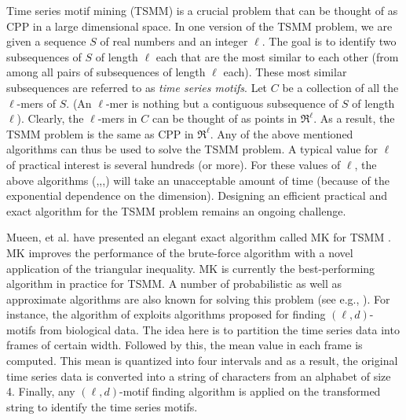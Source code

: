 \documentclass{article}
\theoremstyle{definition}
\theoremstyle{remark}
\begin{document}
Time series motif mining (TSMM) is a crucial problem that can be thought of as CPP in a large dimensional space. In one version of the TSMM problem, we are given a sequence $S$ of real numbers and an integer $\ell$. The goal is to identify two subsequences of $S$ of length $\ell$ each that are the most similar to each other (from among all pairs of subsequences of length $\ell$ each). These most similar subsequences are referred to as {\em time series motifs}. Let $C$ be a collection of all the $\ell$-mers of $S$. (An $\ell$-mer is nothing but a contiguous subsequence of $S$ of length $\ell$). Clearly, the $\ell$-mers in $C$ can be thought of as points in $\Re^\ell$. As a result, the TSMM problem is the same as CPP in $\Re^\ell$. Any of the above mentioned algorithms can thus be used to solve the TSMM problem. A typical value for $\ell$ of practical interest is several hundreds (or more). For these values of $\ell$, the above algorithms (\cite{RAB76},\cite{FH79},\cite{PS86},\cite{SY95}) will take an unacceptable amount of time (because of the exponential dependence on the dimension). Designing an efficient practical and exact algorithm for the TSMM problem remains an ongoing challenge.

Mueen, et al. have presented an elegant exact algorithm called MK for TSMM \cite{AEQSB09}. MK improves the performance of the brute-force algorithm with a novel application of the triangular inequality. MK is currently the best-performing algorithm in practice for TSMM.
A number of probabilistic as well as approximate algorithms are also known for solving this problem (see e.g., \cite{PMPS08,BES03,TCM07,JJMY08,DCIT07,SG04,YKK05}). For instance, the algorithm of \cite{BES03} exploits algorithms proposed for finding $(\ell,d)$-motifs from biological data. The idea here is to partition the time series data into frames of certain width. Followed by this, the mean value in each frame is computed. This mean is quantized into four intervals and as a result, the original time series data is converted into a string of characters from an alphabet of size 4. Finally, any $(\ell,d)$-motif finding algorithm is applied on the transformed string to identify the time series motifs.
\end{document}

